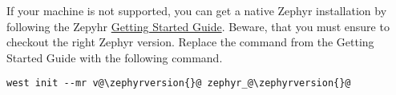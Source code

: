 If your machine is not supported, you can get a native Zephyr installation by following the Zepyhr \href{https://docs.zephyrproject.org/\zephyrversion/develop/getting_started/index.html}{Getting Started Guide}.
Beware, that you must ensure to checkout the right Zephyr version. Replace the  command from the Getting Started Guide with the following command.

\begin{lstlisting}
west init --mr v@\zephyrversion{}@ zephyr_@\zephyrversion{}@
\end{lstlisting}
